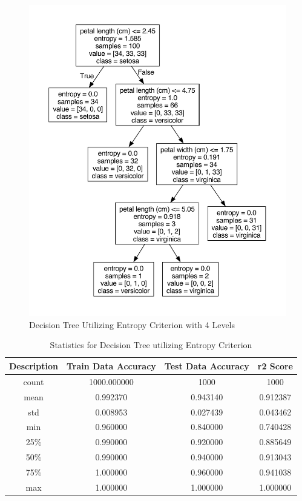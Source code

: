 \documentclass[journal]{IEEEtran}
\begin{document}
\begin{figure}[h!]
\includegraphics[scale=.25]{iris-entropy-4levels.pdf}
\centering
\caption{Decision Tree Utilizing Entropy Criterion with 4 Levels}
\end{figure}

\begin{table}[h!]
\centering
\begin{tabular}{ c | c c c }
    Description & Train Data Accuracy & Test Data Accuracy & r2 Score \\ 
\hline
count     &     1000.000000     &    1000  &1000\\
mean      &        0.992370    &        0.943140   &  0.912387\\
std       &        0.008953    &        0.027439   &  0.043462\\
min      &         0.960000    &        0.840000   &  0.740428\\
25\%      &         0.990000    &        0.920000  &   0.885649\\
50\%      &         0.990000    &        0.940000  &   0.913043\\
75\%      &         1.000000    &        0.960000  &   0.941038\\
max       &        1.000000     &       1.000000   &  1.000000
\end{tabular}
\caption{Statistics for Decision Tree utilizing Entropy Criterion}
\end{table}
\end{document}
